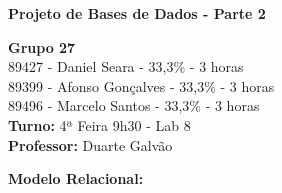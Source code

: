 \documentclass[12pt]{report}
\begin{document}
    \begin{titlepage}
        \begin{center}

            \vspace*{\fill}
            \Huge
            \textbf{Projeto de Bases de Dados - Parte 2}
            
            \vspace*{\fill}

            \Large
            \textbf{Grupo 27} \\
            89427 - Daniel Seara - 33,3\% - 3 horas \\
            89399 - Afonso Gonçalves - 33,3\% - 3 horas \\
            89496 - Marcelo Santos - 33,3\% - 3 horas \\

            \bigskip
            \textbf{Turno:} 4ª Feira 9h30 - Lab 8\\ \textbf{Professor:} Duarte Galvão
        
        \end{center}
    \end{titlepage}






\Large
\textbf{Modelo Relacional:}\\

\normalsize
\vspace{2mm}
\end{document}

